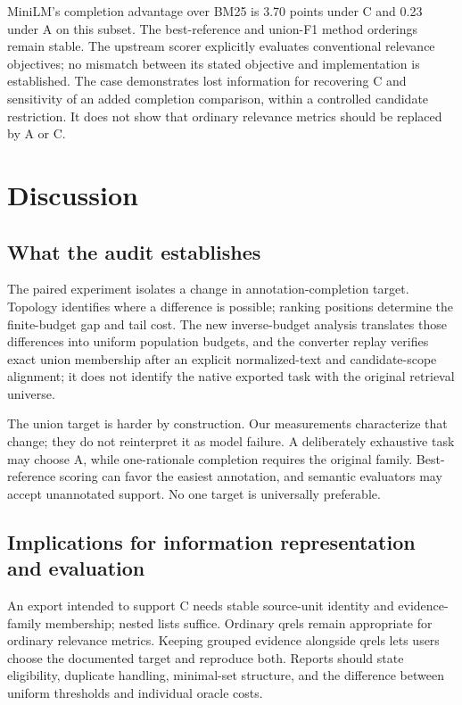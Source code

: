 \documentclass[twoside,a4paper,11pt]{article}
\begin{document}
MiniLM's completion advantage over BM25 is 3.70 points under C and 0.23 under A on this subset. The best-reference and union-F1 method orderings remain stable. The upstream scorer explicitly evaluates conventional relevance objectives; no mismatch between its stated objective and implementation is established. The case demonstrates lost information for recovering C and sensitivity of an added completion comparison, within a controlled candidate restriction. It does not show that ordinary relevance metrics should be replaced by A or C.


\section{Discussion}

\subsection{What the audit establishes}
The paired experiment isolates a change in annotation-completion target. Topology identifies where a difference is possible; ranking positions determine the finite-budget gap and tail cost. The new inverse-budget analysis translates those differences into uniform population budgets, and the converter replay verifies exact union membership after an explicit normalized-text and candidate-scope alignment; it does not identify the native exported task with the original retrieval universe.

The union target is harder by construction. Our measurements characterize that change; they do not reinterpret it as model failure. A deliberately exhaustive task may choose A, while one-rationale completion requires the original family. Best-reference scoring can favor the easiest annotation, and semantic evaluators may accept unannotated support. No one target is universally preferable.


\subsection{Implications for information representation and evaluation}
An export intended to support C needs stable source-unit identity and evidence-family membership; nested lists suffice. Ordinary qrels remain appropriate for ordinary relevance metrics. Keeping grouped evidence alongside qrels lets users choose the documented target and reproduce both. Reports should state eligibility, duplicate handling, minimal-set structure, and the difference between uniform thresholds and individual oracle costs.
\end{document}
